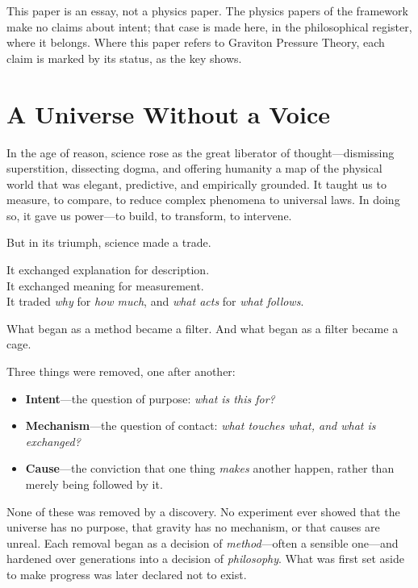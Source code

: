 \documentclass[11pt,a4paper]{article}
\begin{document}
This paper is an essay, not a physics paper. The physics papers of the framework make no claims about intent; that case is made here, in the philosophical register, where it belongs. Where this paper refers to Graviton Pressure Theory, each claim is marked by its status, as the key shows.

\statuskey

\section*{A Universe Without a Voice}

In the age of reason, science rose as the great liberator of thought---dismissing superstition, dissecting dogma, and offering humanity a map of the physical world that was elegant, predictive, and empirically grounded. It taught us to measure, to compare, to reduce complex phenomena to universal laws. In doing so, it gave us power---to build, to transform, to intervene.

But in its triumph, science made a trade.

It exchanged explanation for description.\\
It exchanged meaning for measurement.\\
It traded \emph{why} for \emph{how much}, and \emph{what acts} for \emph{what follows}.

What began as a method became a filter. And what began as a filter became a cage.

Three things were removed, one after another:

\begin{itemize}
  \item \textbf{Intent}---the question of purpose: \emph{what is this for?}
  \item \textbf{Mechanism}---the question of contact: \emph{what touches what, and what is exchanged?}
  \item \textbf{Cause}---the conviction that one thing \emph{makes} another happen, rather than merely being followed by it.
\end{itemize}

None of these was removed by a discovery. No experiment ever showed that the universe has no purpose, that gravity has no mechanism, or that causes are unreal. Each removal began as a decision of \emph{method}---often a sensible one---and hardened over generations into a decision of \emph{philosophy}. What was first set aside to make progress was later declared not to exist.
\end{document}
